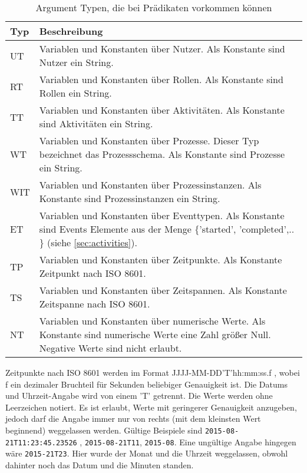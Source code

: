 \begin{table}[h]
\begin{tabular} {|p{2cm}|p{13cm}|}
\hline
\textbf{Typ}&\textbf{Beschreibung}\\
\hline
UT& Variablen und Konstanten über Nutzer. Als Konstante sind Nutzer ein String.\\
\hline
RT& Variablen und Konstanten über Rollen. Als Konstante sind Rollen ein String.\\
\hline
TT& Variablen und Konstanten über Aktivitäten. Als Konstante sind Aktivitäten ein String.\\
\hline
WT& Variablen und Konstanten über Prozesse. Dieser Typ bezeichnet das Prozessschema. Als Konstante sind Prozesse ein String.\\
\hline
WIT& Variablen und Konstanten über Prozessinstanzen. Als Konstante sind Prozessinstanzen ein String.\\
\hline
ET&  Variablen und Konstanten über Eventtypen. Als Konstante sind Events Elemente aus der Menge $\{$'started', 'completed',..$\}$ (siehe \ref{sec:activities}).\\
\hline
TP& Variablen und Konstanten über Zeitpunkte. Als Konstante Zeitpunkt nach ISO 8601.\\
\hline
TS& Variablen und Konstanten über Zeitspannen. Als Konstante Zeitspanne nach ISO 8601.\\
\hline
NT&  Variablen und Konstanten über numerische Werte. Als Konstante sind numerische Werte eine Zahl größer Null. Negative Werte sind nicht erlaubt.\\
\hline
\end{tabular}
\caption{Argument Typen, die bei Prädikaten vorkommen können}
\label{tab:args}
\end{table}

Zeitpunkte nach ISO 8601 werden im Format JJJJ-MM-DD'T'hh:mm:ss.f , wobei f ein dezimaler Bruchteil für Sekunden beliebiger Genauigkeit ist. Die Datums und Uhrzeit-Angabe wird von einem 'T' getrennt. Die Werte werden ohne Leerzeichen notiert. Es ist erlaubt, Werte mit geringerer Genauigkeit anzugeben, jedoch darf die Angabe immer nur von rechts (mit dem kleinsten Wert beginnend) weggelassen werden. Gültige Beispiele sind \texttt{2015-08-21T11:23:45.23526} , \texttt{2015-08-21T11}, \texttt{2015-08}. Eine ungültige Angabe hingegen wäre \texttt{2015-21T23}. Hier wurde der Monat und die Uhrzeit weggelassen, obwohl dahinter noch das Datum und die Minuten standen.

